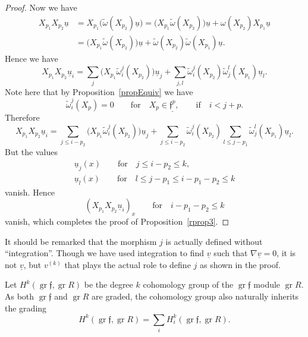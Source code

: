\documentclass[pdftex]{sigma}%
\newcommand{\f}{\mathfrak f}
\newcommand{\gr}{\operatorname{gr}}
\numberwithin{equation}{section}
\begin{document}
\begin{proof}
Now we have
\begin{align*}
	X_{p_1}X_{p_2}\underline u &= X_{p_1} \big( \tilde\omega(X_{p_2})\underline u\big)
	= \big( X_{p_1} \tilde\omega(X_{p_2})\big)\underline u
	+ \omega(X_{p_2})X_{p_1}\underline u
\\
	&= \big( X_{p_1} \tilde\omega(X_{p_2})\big)\underline u
	+ \tilde\omega(X_{p_2})\tilde\omega(X_{p_1})\underline u.
\end{align*}
Hence we have
\[
	X_{p_1}X_{p_2}\underline u_i = \sum_j \big(X_{p_1}\tilde\omega^j_i(X_{p_2})\big)\underline u_j
	+ \sum_{j,l} \tilde\omega^j_i(X_{p_2})\tilde\omega^l_j(X_{p_1})\underline u_l.
\]
Note here that by Proposition~\ref{propEquiv} we have
\[
	\tilde\omega^j_i(X_p) = 0 \qquad\text{for}\quad X_p\in\underline{\f^p},\qquad\text{if}\quad i<j+p.
\]
Therefore
\[
X_{p_1}X_{p_2}\underline u_i = \sum_{j\le i-p_2}\big(X_{p_1}\tilde\omega^j_i(X_{p_2})\big)
\underline u_j
+ \sum_{j\le i-p_2} \tilde\omega^j_i(X_{p_2})\sum_{l\le j-p_1}\tilde\omega^l_j(X_{p_1})\underline u_l.
\]
But the values
\begin{gather*}
\underline u_j(x) \qquad\text{for}\quad j\le i-p_2\le k,
\\
\underline u_l(x) \qquad\text{for}\quad l\le j-p_1\le i-p_1-p_2\le k
\end{gather*}
vanish. Hence
\[
	(X_{p_1}X_{p_2}\underline u_i)_x \qquad\text{for}\quad i-p_1-p_2\le k
\]
vanish, which completes the proof of Proposition~\ref{rprop3}.
\end{proof}

It should be remarked that the morphism $j$ is actually defined without ``integration''.
Though we have used integration to find $\underline v$ such that $\nabla \underline v = 0$, it is not $\underline v$, but $v^{(k)}$ that plays the actual role to define $j$ as shown in the proof.


Let $H^k(\gr\f,\gr R)$ be the degree $k$ cohomology group of the $\gr\f$ module $\gr R$. As both $\gr\f$ and $\gr R$ are graded, the cohomology group also naturally inherits the grading
\[
	H^k(\gr\f,\gr R) = \sum_i H^k_i(\gr\f,\gr R).
\]
\end{document}
